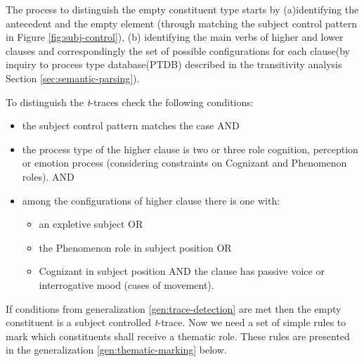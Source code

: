 The process to distinguish the empty constituent type starts by (a)identifying the antecedent and the empty element (through matching the subject control pattern in Figure \ref{fig:subj-control}), (b) identifying the main verbs of higher and lower clauses and correspondingly the set of possible configurations for each clause(by inquiry to process type database(PTDB) described in the transitivity analysis Section \ref{sec:semantic-parsing}).

\begin{generalization}\label{gen:trace-detection}
	To distinguish the \textit{t}-traces check the following conditions:
	\begin{itemize}
		\item the subject control pattern matches the case AND
		\item the process type of the higher clause is two or three role cognition, perception or emotion process (considering constraints on Cognizant and Phenomenon roles). AND
		\item among the configurations of higher clause there is one with:
		\begin{itemize}
			\item an expletive subject OR
			\item the Phenomenon role in subject position OR
			\item Cognizant in subject position AND the clause has passive voice or interrogative mood (cases of movement).
		\end{itemize}
	\end{itemize}
\end{generalization}
If conditions from generalization \ref{gen:trace-detection} are met then the empty constituent is a subject controlled \textit{t}-trace. Now we need a set of simple rules to mark which constituents shall receive a thematic role. These rules are  presented in the generalization \ref{gen:thematic-marking} below.

